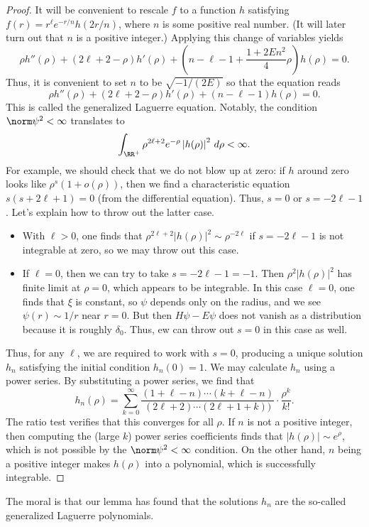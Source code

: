 \documentclass[../notes.tex]{subfiles}
\begin{document}
\begin{proof}
	It will be convenient to rescale $f$ to a function $h$ satisfying $f(r)=r^\ell e^{-r/n}h(2r/n)$, where $n$ is some positive real number. (It will later turn out that $n$ is a positive integer.) Applying this change of variables yields
	\[\rho h''(\rho)+(2\ell+2-\rho)h'(\rho)+\left(n-\ell-1+\frac{1+2En^2}4\rho\right)h(\rho)=0.\]
	Thus, it is convenient to set $n$ to be $\sqrt{-1/(2E)}$ so that the equation reads
	\[\rho h''(\rho)+(2\ell+2-\rho)h'(\rho)+(n-\ell-1)h(\rho)=0.\]
	This is called the generalized Laguerre equation. Notably, the condition $\norm\psi^2<\infty$ translates to
	\[\int_{\RR^+}\rho^{2\ell+2}e^{-\rho}\left|h(\rho)\right|^2\,d\rho<\infty.\]
	For example, we should check that we do not blow up at zero: if $h$ around zero looks like $\rho^s(1+o(\rho))$, then we find a characteristic equation $s(s+2\ell+1)=0$ (from the differential equation). Thus, $s=0$ or $s=-2\ell-1$. Let's explain how to throw out the latter case.
	\begin{itemize}
		\item With $\ell>0$, one finds that $\rho^{2\ell+2}\left|h(\rho)\right|^2\sim\rho^{-2\ell}$ if $s=-2\ell-1$ is not integrable at zero, so we may throw out this case.
		\item If $\ell=0$, then we can try to take $s=-2\ell-1=-1$. Then $\rho^2\left|h(\rho)\right|^2$ has finite limit at $\rho=0$, which appears to be integrable. In this case $\ell=0$, one finds that $\xi$ is constant, so $\psi$ depends only on the radius, and we see $\psi(r)\sim1/r$ near $r=0$. But then $H\psi-E\psi$ does not vanish as a distribution because it is roughly $\delta_0$. Thus, ew can throw out $s=0$ in this case as well.
	\end{itemize}
	Thus, for any $\ell$, we are required to work with $s=0$, producing a unique solution $h_n$ satisfying the initial condition $h_n(0)=1$. We may calculate $h_n$ using a power series. By substituting a power series, we find that
	\[h_n(\rho)=\sum_{k=0}^\infty\frac{(1+\ell-n)\cdots(k+\ell-n)}{(2\ell+2)\cdots(2\ell+1+k))}\cdot\frac{\rho^k}{k!}.\]
	The ratio test verifies that this converges for all $\rho$. If $n$ is not a positive integer, then computing the (large $k$) power series coefficients finds that $\left|h(\rho)\right|\sim e^\rho$, which is not possible by the $\norm\psi^2<\infty$ condition. On the other hand, $n$ being a positive integer makes $h(\rho)$ into a polynomial, which is successfully integrable.
\end{proof}
The moral is that our lemma has found that the solutions $h_n$ are the so-called generalized Laguerre polynomials.
\end{document}

